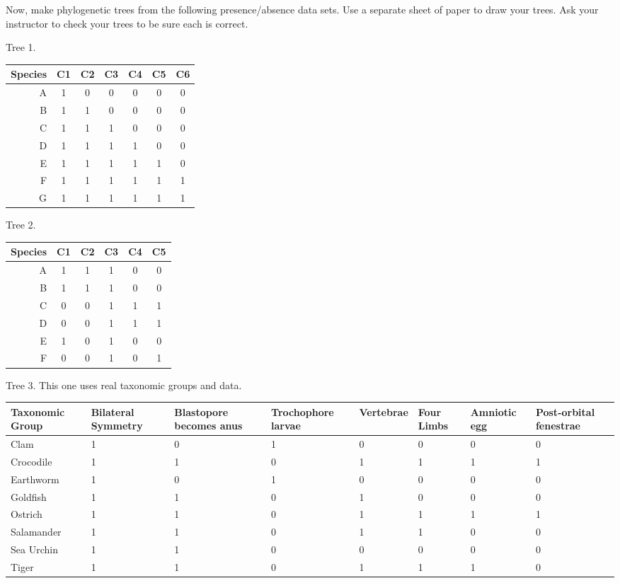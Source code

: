 \documentclass[12pt, addpoints]{exam}
\begin{document}
{\newpage

\thispagestyle{empty}

\begin{questions}
	
\begin{landscape}

Now, make phylogenetic trees from the following presence/absence data sets. Use a separate sheet of paper to draw your trees. Ask your instructor to check your trees to be sure each is correct. %

\liningnum

\begin{minipage}[t]{0.4\textwidth}
\question
Tree 1.

\begin{longtable}[l]{@{}rcccccc@{}}
\toprule
Species & C1 & C2 & C3 & C4 & C5 & C6\tabularnewline
\midrule
A & 1 & 0 & 0 & 0 & 0 & 0\tabularnewline
B & 1 & 1 & 0 & 0 & 0 & 0\tabularnewline
C & 1 & 1 & 1 & 0 & 0 & 0\tabularnewline
D & 1 & 1 & 1 & 1 & 0 & 0\tabularnewline
E & 1 & 1 & 1 & 1 & 1 & 0\tabularnewline
F & 1 & 1 & 1 & 1 & 1 & 1\tabularnewline
G & 1 & 1 & 1 & 1 & 1 & 1\tabularnewline
\bottomrule
\end{longtable}

\end{minipage}\hspace*{2in}
\begin{minipage}[t]{0.4\textwidth}
\question
Tree 2.
\begin{longtable}[l]{@{}rccccc@{}}
\toprule
Species & C1 & C2 & C3 & C4 & C5 \tabularnewline
\midrule
A & 1 & 1 & 1 & 0 & 0 \tabularnewline
B & 1 & 1 & 1 & 0 & 0 \tabularnewline
C & 0 & 0 & 1 & 1 & 1 \tabularnewline
D & 0 & 0 & 1 & 1 & 1 \tabularnewline
E & 1 & 0 & 1 & 0 & 0 \tabularnewline
F & 0 & 0 & 1 & 0 & 1 \tabularnewline
\bottomrule
\end{longtable}

\end{minipage}

\vspace{2\baselineskip}
\question
Tree 3. This one uses real taxonomic groups and data.

\begin{longtable}[l]{@{}L{0.8in}C{0.75in}C{1in}C{1in}C{0.7in}C{0.7in}C{0.7in}C{1in}@{}}
\toprule
Taxonomic Group & Bilateral Symmetry & Blastopore becomes anus & Trochophore larvae & Vertebrae & Four Limbs & Amniotic egg & Post-orbital fenestrae \tabularnewline
\midrule
Clam &
	1 &
	0 &
	1 & 
	0 & 
	0 &
	0 &
	0	\tabularnewline
Crocodile &
	1 & 
	1 & 
	0 & 
	1 & 
	1 & 
	1 & 
	1	\tabularnewline
Earthworm & 
	1 &
	0 &
	1 & 
	0 & 
	0 &
	0 &
	0	\tabularnewline
Goldfish & 
	1 & 
	1 & 
	0 & 
	1 & 
	0 & 
	0 & 
	0	\tabularnewline
Ostrich & 
	1 & 
	1 & 
	0 & 
	1 & 
	1 & 
	1 & 
	1	\tabularnewline
Salamander & 
	1 & 
	1 & 
	0 & 
	1 & 
	1 & 
	0 & 
	0	\tabularnewline
Sea Urchin &
	1 &
	1 &
	0 & 
	0 & 
	0 & 
	0 & 
	0	\tabularnewline
Tiger & 
	1 & 
	1 & 
	0 & 
	1 & 
	1 & 
	1 & 
	0	\tabularnewline
\bottomrule
\end{longtable}



\end{landscape}
\end{questions}}
\end{document}
